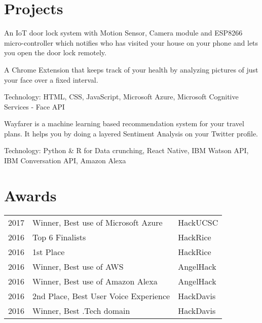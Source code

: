 \documentclass[]{deedy-resume-openfont}
\begin{document}
\begin{minipage}[t]{0.66\textwidth}

\section{Projects}
\location{}
\begin{tightemize}
\item An IoT door lock system with Motion Sensor, Camera module and ESP8266 micro-controller which notifies who has visited your house on your phone and lets you open the door lock remotely.
\end{tightemize}
\sectionsep

\location{}
\begin{tightemize}
\item A Chrome Extension that keeps track of your health by analyzing pictures of just your face over a fixed interval. \\
\item Technology: HTML, CSS, JavaScript, Microsoft Azure, Microsoft Cognitive Services - Face API
\end{tightemize}
\sectionsep

\location{}
\begin{tightemize}
\item Wayfarer is a machine learning based recommendation system for your travel plans. It helps you by doing a layered Sentiment Analysis on your Twitter profile.
\item Technology: Python \& R for Data crunching, React Native, IBM Watson API, IBM Conversation API, Amazon Alexa
\end{tightemize}
\sectionsep


\section{Awards} 
\begin{tabular}{rll}
2017 & Winner, Best use of Microsoft Azure  & HackUCSC \\
2016 & Top 6 Finalists  & HackRice \\
2016 & 1st Place  & HackRice \\
2016 & Winner, Best use of AWS  & AngelHack \\
2016 & Winner, Best use of Amazon Alexa & AngelHack \\
2016 & 2nd Place, Best User Voice Experience & HackDavis \\
2016 & Winner, Best .Tech domain & HackDavis \\
\end{tabular}
\sectionsep

\end{minipage} 
\end{document}
